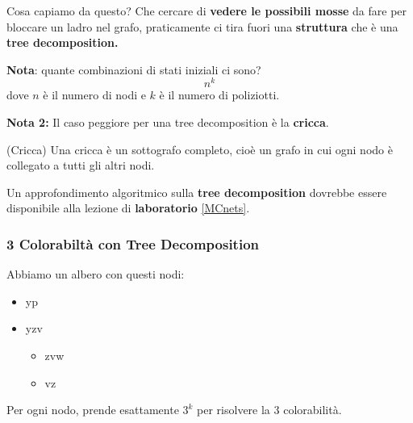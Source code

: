 Cosa capiamo da questo? Che cercare di \textbf{vedere le possibili mosse} da
fare per bloccare un ladro nel grafo, praticamente ci tira fuori una
\textbf{struttura} che è una \textbf{tree decomposition.}

\textbf{Nota}: quante combinazioni di stati iniziali ci sono?
\[
    n^k
\]
dove $n$ è il numero di nodi e $k$ è il numero di poliziotti.

\textbf{Nota 2:} Il caso peggiore per una tree decomposition è la \textbf{cricca}.

\begin{definition}(Cricca)
    Una cricca è un sottografo completo, cioè un grafo in cui ogni nodo è collegato a tutti gli altri nodi.
\end{definition}

Un approfondimento algoritmico sulla \textbf{tree decomposition} dovrebbe
essere disponibile alla lezione di \textbf{laboratorio} \ref{MCnets}.

\subsubsection{3 Colorabiltà con Tree Decomposition}

Abbiamo un albero con questi nodi:
\begin{itemize}
    \item yp
    \item yzv
    \begin{itemize}
        \item zvw
        \item vz
    \end{itemize}
\end{itemize}


Per ogni nodo, prende esattamente $3^k$ per risolvere la 3 colorabilità.

